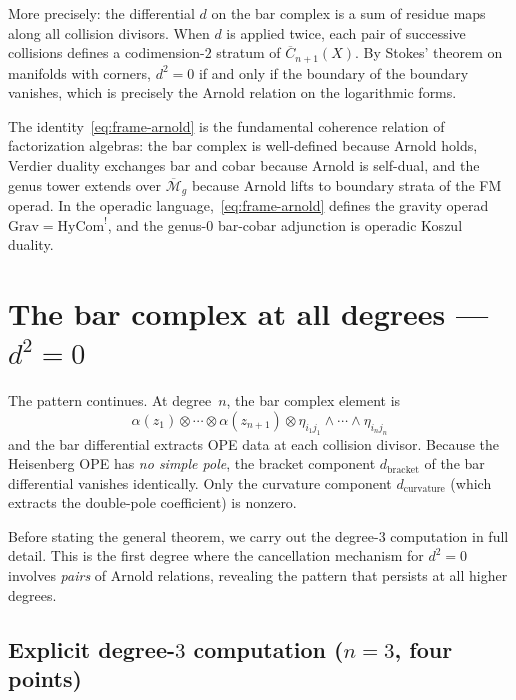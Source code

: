More precisely: the differential $d$ on the bar complex is a sum of
residue maps along all collision divisors.  When $d$ is applied twice,
each pair of successive collisions defines a codimension-$2$ stratum
of $\overline{C}_{n+1}(X)$.  By Stokes' theorem on manifolds with
corners, $d^2 = 0$ if and only if the boundary of the boundary
vanishes, which is precisely the Arnold relation on the logarithmic
forms.

\begin{remark}
\label{rem:frame-arnold-factorization}
The identity~\eqref{eq:frame-arnold} is the fundamental coherence relation of factorization algebras: the bar complex is well-defined because Arnold holds, Verdier duality exchanges bar and cobar because Arnold is self-dual, and the genus tower extends over $\overline{\mathcal{M}}_g$ because Arnold lifts to boundary strata of the FM operad.  In the operadic language,~\eqref{eq:frame-arnold} defines the gravity operad $\mathrm{Grav} = \mathrm{HyCom}^!$, and the genus-$0$ bar-cobar adjunction is operadic Koszul duality.
\end{remark}

\section{\texorpdfstring{The bar complex at all degrees --- $d^2 = 0$}{The bar complex at all degrees --- d squared equals zero}}
\label{sec:frame-bar-all}

The pattern continues.  At degree~$n$, the bar complex element is
\begin{equation}\label{eq:frame-barn-element}
\alpha(z_1) \otimes \cdots \otimes \alpha(z_{n+1})
\otimes \eta_{i_1 j_1} \wedge \cdots \wedge \eta_{i_n j_n}
\end{equation}
and the bar differential extracts OPE data at each collision divisor.
Because the Heisenberg OPE has \emph{no simple pole}, the bracket
component $d_{\mathrm{bracket}}$ of the bar differential vanishes
identically.  Only the curvature component
$d_{\mathrm{curvature}}$ (which extracts the double-pole coefficient)
is nonzero.

Before stating the general theorem, we carry out the degree-$3$
computation in full detail.  This is the first degree where the
cancellation mechanism for $d^2 = 0$ involves \emph{pairs} of
Arnold relations, revealing the pattern that persists at all
higher degrees.

\subsection{\texorpdfstring{Explicit degree-$3$ computation ($n = 3$, four points)}{Explicit degree-3 computation (n = 3, four points)}}
\label{subsec:frame-degree3}

